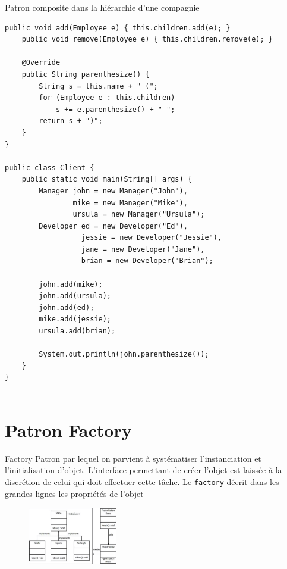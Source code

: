 \documentclass[16pt]{report}
\begin{document}
\begin{multicols*}{2}
\begin{EExample}{Patron composite dans la hiérarchie d'une compagnie}{}
\begin{lstlisting}[style=JavaDraculaWhite]
    public void add(Employee e) { this.children.add(e); }
    public void remove(Employee e) { this.children.remove(e); }

    @Override
    public String parenthesize() {
        String s = this.name + " (";
        for (Employee e : this.children)
            s += e.parenthesize() + " ";
        return s + ")";
    }
}

public class Client {
    public static void main(String[] args) {
        Manager john = new Manager("John"),
                mike = new Manager("Mike"),
                ursula = new Manager("Ursula");
        Developer ed = new Developer("Ed"),
                  jessie = new Developer("Jessie"),
                  jane = new Developer("Jane"),
                  brian = new Developer("Brian");

        john.add(mike);
        john.add(ursula);
        john.add(ed);
        mike.add(jessie);
        ursula.add(brian);

        System.out.println(john.parenthesize());
    }
}
    
\end{lstlisting}
    \end{EExample}

    \section{Patron Factory}


    \begin{Concept}{Factory}{}
        Patron par lequel on parvient à systématiser l'instanciation et l'initialisation d'objet. 
        L'interface permettant de créer l'objet est laissée à la discrétion de celui qui doit 
        effectuer cette tâche. Le \texttt{factory} décrit dans les grandes lignes les propriétés de 
        l'objet
    \end{Concept}

    \begin{figure}[H]
        \begin{center}
            \includegraphics[width=0.35\textwidth]{shapesFactory.png}
        \end{center}
    \end{figure}



\end{multicols*}
\end{document}
